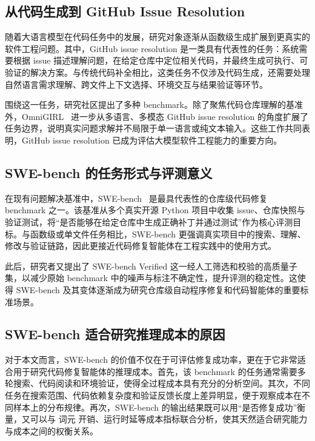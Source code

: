 \subsection{从代码生成到 GitHub Issue Resolution}

随着大语言模型在代码任务中的发展，研究对象逐渐从函数级生成扩展到更真实的软件工程问题。其中，GitHub issue resolution 是一类具有代表性的任务：系统需要根据 issue 描述理解问题，在给定仓库中定位相关代码，并最终生成可执行、可验证的解决方案。与传统代码补全相比，这类任务不仅涉及代码生成，还需要处理自然语言需求理解、跨文件上下文选择、环境交互与结果验证等环节。

围绕这一任务，研究社区提出了多种 benchmark。除了聚焦代码仓库理解的基准外，OmniGIRL~\cite{guo2025omnigirl} 进一步从多语言、多模态 GitHub issue resolution 的角度扩展了任务边界，说明真实问题求解并不局限于单一语言或纯文本输入。这些工作共同表明，GitHub issue resolution 已成为评估大模型软件工程能力的重要方向。

\subsection{SWE-bench 的任务形式与评测意义}

在现有问题解决基准中，SWE-bench~\cite{jimenez2023swebench} 是最具代表性的仓库级代码修复 benchmark 之一。该基准从多个真实开源 Python 项目中收集 issue、仓库快照与验证测试，将“是否能够在给定仓库中生成正确补丁并通过测试”作为核心评测目标。与函数级或单文件任务相比，SWE-bench 更强调真实项目中的搜索、理解、修改与验证链路，因此更接近代码修复智能体在工程实践中的使用方式。

此后，研究者又提出了 SWE-bench Verified 这一经人工筛选和校验的高质量子集，以减少原始 benchmark 中的噪声与标注不确定性，提升评测的稳定性。这使得 SWE-bench 及其变体逐渐成为研究仓库级自动程序修复和代码智能体的重要标准场景。

\subsection{SWE-bench 适合研究推理成本的原因}

对于本文而言，SWE-bench 的价值不仅在于可评估修复成功率，更在于它非常适合用于研究代码修复智能体的推理成本。首先，该 benchmark 的任务通常需要多轮搜索、代码阅读和环境验证，使得全过程成本具有充分的分析空间。其次，不同任务在搜索范围、代码依赖复杂度和验证反馈长度上差异明显，便于观察成本在不同样本上的分布规律。再次，SWE-bench 的输出结果既可以用“是否修复成功”衡量，又可以与 词元 开销、运行时延等成本指标联合分析，使其天然适合研究能力与成本之间的权衡关系。

